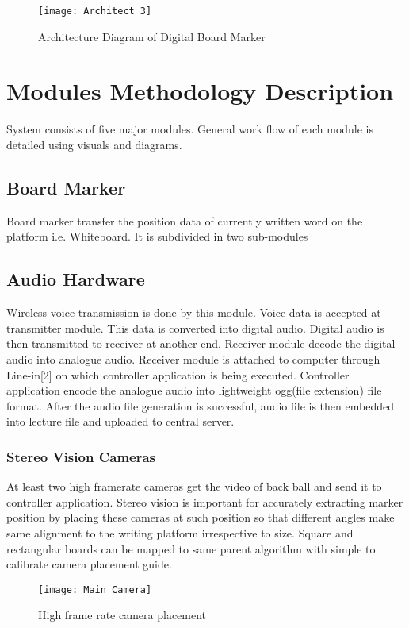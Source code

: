 \begin{figure}[h]
  \centering
  \texttt{[image: Architect 3]}
  \caption{Architecture Diagram of Digital Board Marker}
\end{figure}
\bigskip

\section{Modules Methodology Description}
System consists of five major modules. General work flow of each module is detailed using visuals and diagrams.
\subsection{Board Marker}
Board marker transfer the position data of currently written word on the platform i.e. Whiteboard. It is subdivided in two sub-modules
\subsection{Audio Hardware}
Wireless voice transmission is done by this module. Voice data is accepted at transmitter module. This data is converted into digital audio. Digital audio is then transmitted to receiver at another end. Receiver module decode the digital audio into analogue audio. Receiver module is attached to computer through Line-in[2] on which controller application is being executed. Controller application encode the analogue audio into lightweight ogg(file extension) file format. After the audio file generation is successful, audio file is then embedded into lecture file and uploaded to central server.
\subsubsection{Stereo Vision Cameras}
At least two high framerate cameras get the video of back ball and send it to controller application. Stereo vision is important for accurately extracting marker position by placing these cameras at such position so that different angles make same alignment to the writing platform irrespective to size. Square and rectangular boards can be mapped to same parent algorithm with simple to calibrate camera placement guide.

\bigskip

\begin{figure}[h]
  \centering
  \texttt{[image: Main\_Camera]}
  \caption{High frame rate camera placement}
\end{figure}





